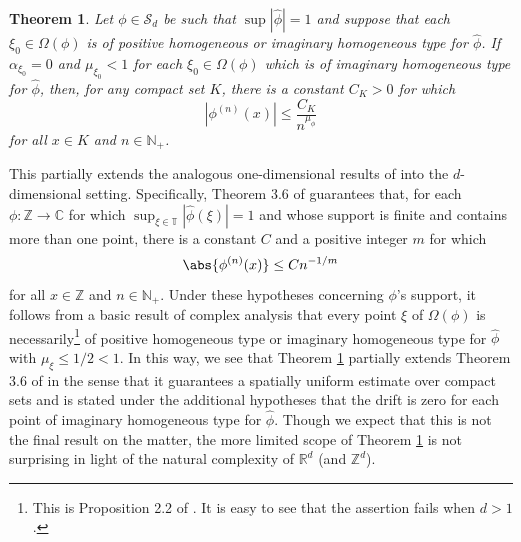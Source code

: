 \documentclass[11pt, letter]{book}
\newtheorem{theorem}{Theorem}[section]
\begin{document}
\begin{framed}
\begin{theorem}\label{thm:ConvolutionPowerEstimate}
Let $\phi\in\mathcal{S}_d$ be such that $\sup |\widehat{\phi}|=1$ and suppose that each $\xi_0\in\Omega(\phi)$ is of positive homogeneous or imaginary homogeneous type for $\widehat{\phi}$. If $\alpha_{\xi_0}=0$ and $\mu_{\xi_0}<1$ for each $\xi_0\in\Omega(\phi)$ which is of imaginary homogeneous type for $\widehat{\phi}$, then, for any compact set $K$, there is a constant $C_K>0$ for which
\begin{equation*}
    \left|\phi^{(n)}(x)\right|\leq\frac{C_K}{n^{\mu_\phi}}
\end{equation*}
for all $x\in K$ and $n\in\mathbb{N}_+$.
\end{theorem}
\end{framed}


\noindent This partially extends the analogous one-dimensional results of \cite{randles_convolution_2015} into the $d$-dimensional setting. Specifically, Theorem 3.6 of \cite{randles_convolution_2015} guarantees that, for each $\phi:\mathbb{Z}\to\mathbb{C}$ for which $\sup_{\xi\in\mathbb{T}}|\widehat{\phi}(\xi)|=1$ and whose support is finite and contains more than one point, there is a constant $C$ and a positive integer $m$ for which
\begin{equation*}
    \abs{\phi^{(n)}(x)}\leq Cn^{-1/m}
\end{equation*}
for all $x\in\mathbb{Z}$ and $n\in\mathbb{N}_+$. Under these hypotheses concerning $\phi$'s support, it follows from a basic result of complex analysis that every point $\xi$ of $\Omega(\phi)$ is necessarily\footnote{This is Proposition 2.2 of \cite{randles_convolution_2015}. It is easy to see that the assertion fails when $d>1$.} of positive homogeneous type or imaginary homogeneous type for $\widehat{\phi}$ with $\mu_{\xi}\leq 1/2<1$. In this way, we see that Theorem \ref{thm:ConvolutionPowerEstimate} partially extends Theorem 3.6 of \cite{randles_convolution_2015} in the sense that it guarantees a spatially uniform estimate over compact sets and is stated under the additional hypotheses that the drift is zero for each point of imaginary homogeneous type for $\widehat{\phi}$. Though we expect that this is not the final result on the matter, the more limited scope of Theorem \ref{thm:ConvolutionPowerEstimate} is not surprising in light of the natural complexity of $\mathbb{R}^d$ (and $\mathbb{Z}^d$).\\
\end{document}

